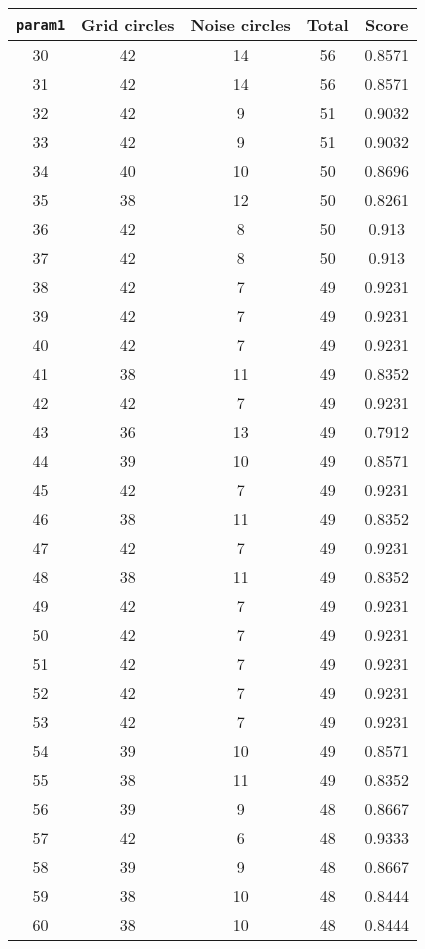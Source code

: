 \documentclass[letterpaper, 12pt]{article}
\begin{document}
\begin{longtable}{|c|c|c|c|c|}
\hline
\textbf{\texttt{param1}} & \textbf{Grid circles} & \textbf{Noise circles} & \textbf{Total} & \textbf{Score} \\
\hline
30 & 42 & 14 & 56 & 0.8571 \\
\hline
31 & 42 & 14 & 56 & 0.8571 \\
\hline
32 & 42 & 9 & 51 & 0.9032 \\
\hline
33 & 42 & 9 & 51 & 0.9032 \\
\hline
34 & 40 & 10 & 50 & 0.8696 \\
\hline
35 & 38 & 12 & 50 & 0.8261 \\
\hline
36 & 42 & 8 & 50 & 0.913 \\
\hline
37 & 42 & 8 & 50 & 0.913 \\
\hline
38 & 42 & 7 & 49 & 0.9231 \\
\hline
39 & 42 & 7 & 49 & 0.9231 \\
\hline
40 & 42 & 7 & 49 & 0.9231 \\
\hline
41 & 38 & 11 & 49 & 0.8352 \\
\hline
42 & 42 & 7 & 49 & 0.9231 \\
\hline
43 & 36 & 13 & 49 & 0.7912 \\
\hline
44 & 39 & 10 & 49 & 0.8571 \\
\hline
45 & 42 & 7 & 49 & 0.9231 \\
\hline
46 & 38 & 11 & 49 & 0.8352 \\
\hline
47 & 42 & 7 & 49 & 0.9231 \\
\hline
48 & 38 & 11 & 49 & 0.8352 \\
\hline
49 & 42 & 7 & 49 & 0.9231 \\
\hline
50 & 42 & 7 & 49 & 0.9231 \\
\hline
51 & 42 & 7 & 49 & 0.9231 \\
\hline
52 & 42 & 7 & 49 & 0.9231 \\
\hline
53 & 42 & 7 & 49 & 0.9231 \\
\hline
54 & 39 & 10 & 49 & 0.8571 \\
\hline
55 & 38 & 11 & 49 & 0.8352 \\
\hline
56 & 39 & 9 & 48 & 0.8667 \\
\hline
57 & 42 & 6 & 48 & 0.9333 \\
\hline
58 & 39 & 9 & 48 & 0.8667 \\
\hline
59 & 38 & 10 & 48 & 0.8444 \\
\hline
60 & 38 & 10 & 48 & 0.8444 \\
\hline

\end{longtable}
\end{document}
